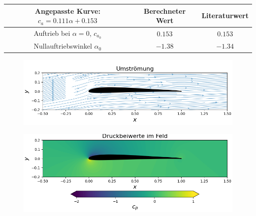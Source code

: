 \begin{table}[H]
\label{tab:sc20614cawerte}
\begin{center}
\begin{tabular}{c|cc}
Angepasste Kurve: $c_a = 0.111 \alpha + 0.153$ & Berechneter Wert & Literaturwert \cite{bigfoil} \\
\midrule
Auftrieb bei $\alpha = 0$, $c_{a_0}$ & $0.153$ & $0.153$ \\
Nullauftriebswinkel $\alpha_{0}$ & $-1.38$ & $-1.34$ 
\end{tabular}
\end{center}
\end{table}

\begin{figure}[H]
\begin{center} \includegraphics[scale=0.65]{figures/z40stream.png} \end{center}
\end{figure}
\begin{figure}[H]
\begin{center} \includegraphics[scale=0.65]{figures/z40contourcp.png} \end{center}
\end{figure}
\newpage
